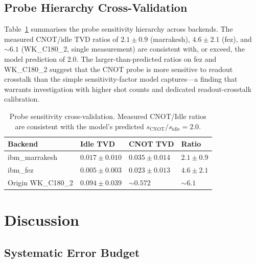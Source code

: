 \documentclass[ASNA,twocolumn]{USG}
\begin{document}
\subsection{Probe Hierarchy Cross-Validation}

Table~\ref{tab:probe_hierarchy} summarises the probe sensitivity hierarchy across backends. The measured CNOT/idle TVD ratios of $2.1 \pm 0.9$ (marrakesh), $4.6 \pm 2.1$ (fez), and $\sim 6.1$ (WK\_C180\_2, single measurement) are consistent with, or exceed, the model prediction of $2.0$. The larger-than-predicted ratios on fez and WK\_C180\_2 suggest that the CNOT probe is more sensitive to readout crosstalk than the simple sensitivity-factor model captures---a finding that warrants investigation with higher shot counts and dedicated readout-crosstalk calibration.

\begin{table}[t]
\centering
\caption{Probe sensitivity cross-validation. Measured CNOT/Idle ratios are consistent with the model's predicted $s_{\mathrm{CNOT}}/s_{\mathrm{idle}} = 2.0$.}
\label{tab:probe_hierarchy}
\scriptsize
\begin{tabular}{p{2.1cm}p{1.8cm}p{1.8cm}p{1.4cm}}
\toprule
Backend & Idle TVD & CNOT TVD & Ratio \\
\midrule
ibm\_marrakesh & $0.017{\pm}0.010$ & $0.035{\pm}0.014$ & $2.1{\pm}0.9$ \\
ibm\_fez        & $0.005{\pm}0.003$ & $0.023{\pm}0.013$ & $4.6{\pm}2.1$ \\
Origin WK\_C180\_2 & $0.094{\pm}0.039$ & $\sim 0.572$ & $\sim 6.1$ \\
\bottomrule
\end{tabular}
\end{table}

\section{Discussion}
\label{sec:discussion}

\subsection{Systematic Error Budget}
\end{document}
